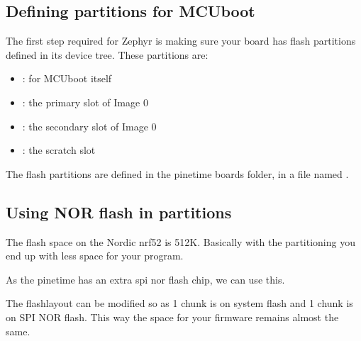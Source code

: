 \documentclass[letterpaper,10pt,english]{sphinxmanual}
\begin{document}
\subsection{Defining partitions for MCUboot}
\label{\detokenize{fota/partitions:defining-partitions-for-mcuboot}}
The first step required for Zephyr is making sure your board has flash
partitions defined in its device tree. These partitions are:
\begin{itemize}
\item {} 
: for MCUboot itself

\item {} 
: the primary slot of Image 0

\item {} 
: the secondary slot of Image 0

\item {} 
: the scratch slot

\end{itemize}

The flash partitions are defined in the pinetime boards folder, in a
file named .


\subsection{Using NOR flash in partitions}
\label{\detokenize{fota/partitions:using-nor-flash-in-partitions}}
The flash space on the Nordic nrf52 is 512K.
Basically with the partitioning you end up with less space for your program.

As the pinetime has an extra spi nor flash chip, we can use this.

The flash\sphinxhyphen{}layout can be modified so as 1 chunk is on system flash and 1 chunk is on SPI NOR flash.
This way the space for your firmware remains almost the same.
\end{document}
